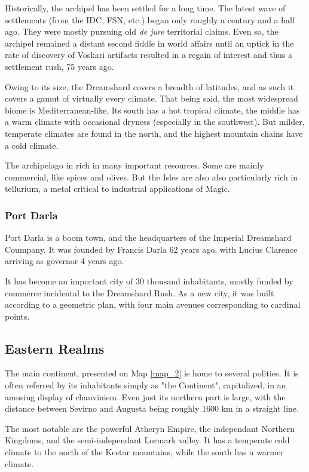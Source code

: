 Historically, the archipel has been settled for a long time. The latest wave of settlements (from the IDC, FSN, etc.) began only roughly a century and a half ago. They were mostly pursuing old \textit{de jure} territorial claims. Even so, the archipel remained a distant second fiddle in world affairs until an uptick in the rate of discovery of Voskari artifacts resulted in a regain of interest and thus a settlement rush, 75 years ago.

Owing to its size, the Dreamshard covers a breadth of latitudes, and as such it covers a gamut of virtually every climate. That being said, the most widespread biome is Mediterranean-like. Its south has a hot tropical climate, the middle has a warm climate with occasional dryness (especially in the southwest). But milder, temperate climates are found in the north, and the highest mountain chains have a cold climate.

The archipelago in rich in many important resources. Some are mainly commercial, like spices and olives. But the Isles are also also particularly rich in tellurium, a metal critical to industrial applications of Magic.



\subsubsection{Port Darla}

Port Darla is a boom town, and the headquarters of the Imperial Dreamshard Coumpany. It was founded by Francis Darla 62 years ago, with Lucius Clarence arriving as governor 4 years ago. 

It has become an important city of 30 thousand inhabitants, mostly funded by commerce incidental to the Dreamshard Rush. As a new city, it was built according to a geometric plan, with four main avenues corresponding to cardinal points.


\subsection{Eastern Realms}

The main continent, presented on Map \ref{map_2} is home to several polities. It is often referred by its inhabitants simply as "the Continent", capitalized, in an amusing display of chauvinism. Even just its northern part is large, with the distance between Sevirno and Augusta being roughly 1600 km in a straight line.

The most notable are the powerful Atheryn Empire, the independant Northern Kingdoms, and the semi-independant Lormark valley. It has a temperate cold climate to the north of the Kestar mountains, while the south has a warmer climate.

